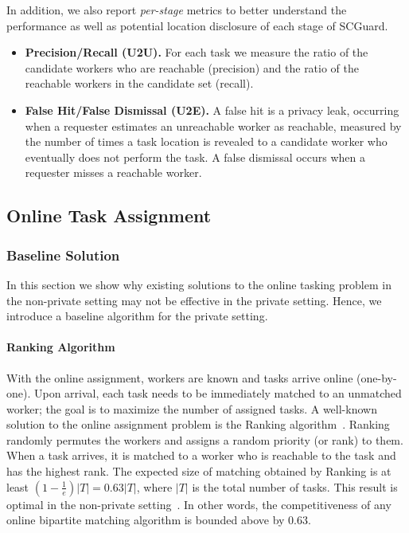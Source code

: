 \documentclass{USC-Thesis}
\renewcommand\bf\bfseries  %
\newcommand{\SCG}{{SCGuard}}
\numberwithin{equation}{chapter}
\begin{document}
In addition, we also report \emph{per-stage} metrics to better understand the performance as well as potential location disclosure of each stage of \SCG.
\begin{itemize}
\item
{\bf Precision/Recall (U2U).} For each task we measure the ratio of the candidate workers who are reachable (precision) and the ratio of the reachable workers in the candidate set (recall).
\item
{\bf False Hit/False Dismissal (U2E).} A false hit is a privacy leak, occurring when a requester estimates an unreachable worker as reachable, measured by the number of times a task location is revealed to a candidate worker who eventually does not perform the task.
A false dismissal occurs when a requester misses a reachable worker.
\end{itemize}

\subsection{Online Task Assignment}
\label{sec:ota}
\subsubsection{Baseline Solution}
In this section we show why existing solutions to the online tasking problem in the non-private setting may not be effective in the private setting. Hence, we introduce a baseline algorithm for the private setting.

\paragraph{Ranking Algorithm}
\label{sec:non-private}
With the online assignment, workers are known and tasks arrive online (one-by-one). Upon arrival, each task needs to be immediately matched to an unmatched worker; the goal is to maximize the number of assigned tasks. A well-known solution to the online assignment problem is the Ranking algorithm~\cite{karp1990optimal}. Ranking randomly permutes the workers and assigns a random priority (or rank) to them. When a task arrives, it is matched to a worker who is reachable to the task and has the highest rank. The expected size of matching obtained by Ranking is at least $(1-\frac{1}{e})|T|=0.63|T|$, where $|T|$ is the total number of tasks. This result is optimal in the non-private setting~\cite{karp1990optimal}. In other words, the competitiveness of any online bipartite matching algorithm is bounded above by 0.63.
\end{document}
